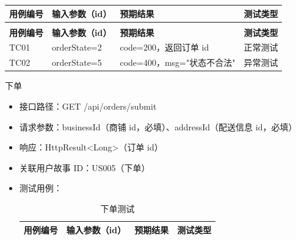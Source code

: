 \begin{levellist}
\begin{levellist}
\begin{itemize}
\begin{longtable}{>{\centering\arraybackslash}m{1.7cm} >{\centering\arraybackslash}m{3cm} >{\centering\arraybackslash}m{6.3cm} >{\centering\arraybackslash}m{2cm}}
                      \toprule
                      \textbf{用例编号} & \textbf{输入参数（id）} & \textbf{预期结果}        & \textbf{测试类型} \\
                      \midrule
                      \endfirsthead

                      \multicolumn{4}{c}{{\tablename\ \thetable{} 续表}}                         \\
                      \toprule
                      \textbf{用例编号} & \textbf{输入参数（id）} & \textbf{预期结果}        & \textbf{测试类型} \\
                      \midrule
                      \endhead

                      \bottomrule
                      \endfoot

                      TC01          & orderState=2      & code=200，返回订单 id     & 正常测试          \\
                      TC02          & orderState=5      & code=400，msg="状态不合法" & 异常测试          \\
                  \end{longtable}
        \end{itemize}

        \item 下单
        \begin{itemize}
            \item 接口路径：GET /api/orders/submit
            \item 请求参数：businessId（商铺 id，必填）、addressId（配送信息 id，必填）
            \item 响应：HttpResult<Long>（订单 id）
            \item 关联用户故事 ID：US005（下单）
            \item 测试用例：
                  \begin{longtable}{>{\centering\arraybackslash}m{1.7cm} >{\centering\arraybackslash}m{3cm} >{\centering\arraybackslash}m{6.3cm} >{\centering\arraybackslash}m{2cm}}

                      \caption{下单测试} \label{tab:training}                                      \\

                      \toprule
                      \textbf{用例编号} & \textbf{输入参数（id）} & \textbf{预期结果}        & \textbf{测试类型} \\
                      \midrule
                      \endfirsthead


\end{longtable}
\end{itemize}
\end{levellist}
\end{levellist}

